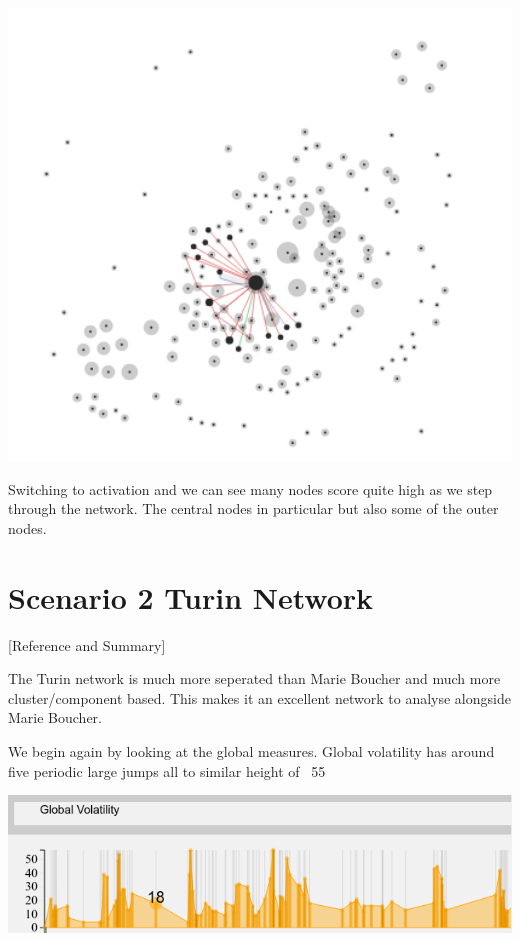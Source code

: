 \begin{center}
\includegraphics[trim={0 0 0 0}, width=140mm]{./Figures/marieBoucherLocalActivationPeriod1.png}
\end{center}   
Switching to activation and we can see many nodes score quite high as we step through the network. The central nodes in particular but also some of the outer nodes.

\section{Scenario 2 Turin Network}

[Reference and Summary]

The Turin network is much more seperated than Marie Boucher and much more cluster/component based. This makes it an excellent network to analyse alongside Marie Boucher.

We begin again by looking at the global measures. Global volatility has around five periodic large jumps all to similar height of ~55
\begin{center}
\includegraphics[trim={0 0 0 0}, width=140mm]{./Figures/TurinGlobalVolatility.png}
\end{center}   


